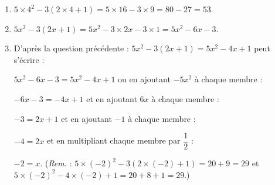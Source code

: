 \documentclass[10pt]{article}
\begin{document}
\setlength\parindent{0mm}
\pagestyle{fancy}
\thispagestyle{empty}
    
    
    




\medskip

\begin{enumerate}
\item %
$5 \times 4^2 - 3(2\times 4+1) = 5 \times 16 - 3\times 9 = 80 - 27 = 53$.
\item %
$5x^2 - 3(2x + 1) = 5x^2 - 3 \times 2x - 3 \times 1 = 5x^2 - 6x - 3$.
\item %
D'après la question précédente : $5x^2 - 3(2x+1)= 5x^2 - 4x +1$ peut s'écrire :

$5x^2 - 6x - 3 = 5x^2 - 4x +1$ ou en ajoutant $- 5x^2$ à chaque membre :

$- 6x - 3 = - 4x + 1$ et en ajoutant $6x$ à chaque membre :

$- 3 = 2x + 1$ et en ajoutant $- 1 $ à chaque membre :

$- 4 = 2x$ et en multipliant chaque membre par $\dfrac{1}{2}$ :

$- 2 =x$.
(\emph{Rem.} : $5\times (- 2)^2 - 3(2 \times (- 2) + 1) = 20 + 9 = 29 $ et 
$5\times (- 2)^2 - 4\times (- 2) +1 = 20 + 8 + 1 = 29$.)
\end{enumerate}



\vspace{0,5cm}
\end{document}
